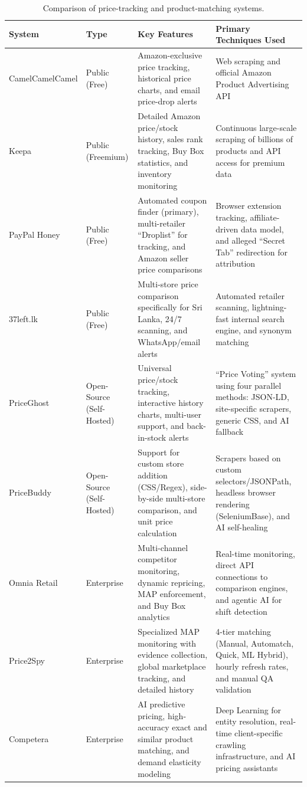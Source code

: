 \begin{table}[H]
\centering
\footnotesize
\begin{tabularx}{\textwidth}{|p{2.3cm}|p{2.7cm}|X|X|}
\hline
\textbf{System} & \textbf{Type} & \textbf{Key Features} & \textbf{Primary Techniques Used} \\
\hline
Camel\-Camel\-Camel & Public (Free) & Amazon-exclusive price tracking, historical price charts, and email price-drop alerts & Web scraping and official Amazon Product Advertising API \\
\hline
Keepa & Public (Freemium) & Detailed Amazon price/stock history, sales rank tracking, Buy Box statistics, and inventory monitoring & Continuous large-scale scraping of billions of products and API access for premium data \\
\hline
PayPal Honey & Public (Free) & Automated coupon finder (primary), multi-retailer ``Droplist'' for tracking, and Amazon seller price comparisons & Browser extension tracking, affiliate-driven data model, and alleged ``Secret Tab'' redirection for attribution \\
\hline
37left.lk & Public (Free) & Multi-store price comparison specifically for Sri Lanka, 24/7 scanning, and WhatsApp/email alerts & Automated retailer scanning, lightning-fast internal search engine, and synonym matching \\
\hline
PriceGhost & Open-Source (Self-Hosted) & Universal price/stock tracking, interactive history charts, multi-user support, and back-in-stock alerts & ``Price Voting'' system using four parallel methods: JSON-LD, site-specific scrapers, generic CSS, and AI fallback \\
\hline
PriceBuddy & Open-Source (Self-Hosted) & Support for custom store addition (CSS/Regex), side-by-side multi-store comparison, and unit price calculation & Scrapers based on custom selectors/JSONPath, headless browser rendering (SeleniumBase), and AI self-healing \\
\hline
Omnia Retail & Enterprise & Multi-channel competitor monitoring, dynamic repricing, MAP enforcement, and Buy Box analytics & Real-time monitoring, direct API connections to comparison engines, and agentic AI for shift detection \\
\hline
Price2Spy & Enterprise & Specialized MAP monitoring with evidence collection, global marketplace tracking, and detailed history & 4-tier matching (Manual, Automatch, Quick, ML Hybrid), hourly refresh rates, and manual QA validation \\
\hline
Competera & Enterprise & AI predictive pricing, high-accuracy exact and similar product matching, and demand elasticity modeling & Deep Learning for entity resolution, real-time client-specific crawling infrastructure, and AI pricing assistants \\
\hline
\end{tabularx}
\caption{Comparison of price-tracking and product-matching systems.}
\label{tab:detailed_systems_comparison}
\end{table}

